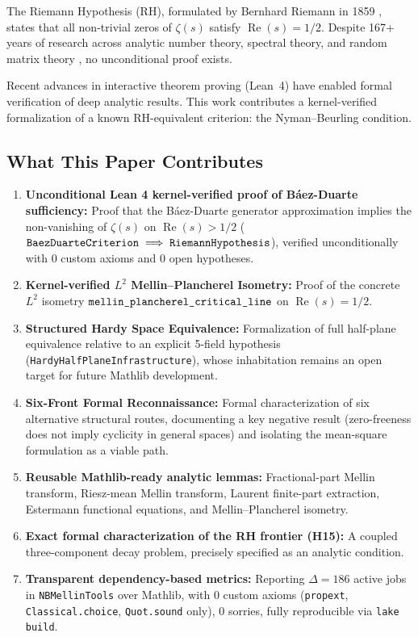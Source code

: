 \documentclass[11pt,a4paper]{article}
\theoremstyle{plain}
\theoremstyle{definition}
\theoremstyle{remark}
\DeclareMathOperator{\RePart}{Re}
\renewcommand{\Re}{\RePart}
\begin{document}
The Riemann Hypothesis (RH), formulated by Bernhard Riemann in 1859 \cite{Riemann1859}, states that all non-trivial zeros of $\zeta(s)$ satisfy $\Re(s) = 1/2$. Despite 167+ years of research across analytic number theory, spectral theory, and random matrix theory \cite{IwaniecKowalski2004,MontgomeryVaughan2007,Tenenbaum2015}, no unconditional proof exists.

Recent advances in interactive theorem proving (Lean~4) \cite{MouraUllrich2021} have enabled formal verification of deep analytic results. This work contributes a kernel-verified formalization of a known RH-equivalent criterion: the Nyman--Beurling condition.

\subsection{What This Paper Contributes}

\begin{enumerate}[label=\textbf{\arabic*.}]
  \item \textbf{Unconditional Lean 4 kernel-verified proof of Báez-Duarte sufficiency:} Proof that the B\'aez-Duarte generator approximation implies the non-vanishing of $\zeta(s)$ on $\Re(s) > 1/2$ ($\text{\texttt{BaezDuarteCriterion}} \implies \text{\texttt{RiemannHypothesis}}$), verified unconditionally with 0 custom axioms and 0 open hypotheses.
  \item \textbf{Kernel-verified $L^2$ Mellin--Plancherel Isometry:} Proof of the concrete $L^2$ isometry $\text{\texttt{mellin\_plancherel\_critical\_line}}$ on $\Re(s) = 1/2$.
  \item \textbf{Structured Hardy Space Equivalence:} Formalization of full half-plane equivalence relative to an explicit 5-field hypothesis (\texttt{HardyHalfPlaneInfrastructure}), whose inhabitation remains an open target for future Mathlib development.
  \item \textbf{Six-Front Formal Reconnaissance:} Formal characterization of six alternative structural routes, documenting a key negative result (zero-freeness does not imply cyclicity in general spaces) and isolating the mean-square formulation as a viable path.
  \item \textbf{Reusable Mathlib-ready analytic lemmas:} Fractional-part Mellin transform, Riesz-mean Mellin transform, Laurent finite-part extraction, Estermann functional equations, and Mellin--Plancherel isometry.
  \item \textbf{Exact formal characterization of the RH frontier (H15):} A coupled three-component decay problem, precisely specified as an analytic condition.
  \item \textbf{Transparent dependency-based metrics:} Reporting $\Delta = 186$ active jobs in \texttt{NBMellinTools} over Mathlib, with 0 custom axioms (\texttt{propext}, \texttt{Classical.choice}, \texttt{Quot.sound} only), 0 sorries, fully reproducible via \texttt{lake build}.
\end{enumerate}
\end{document}
